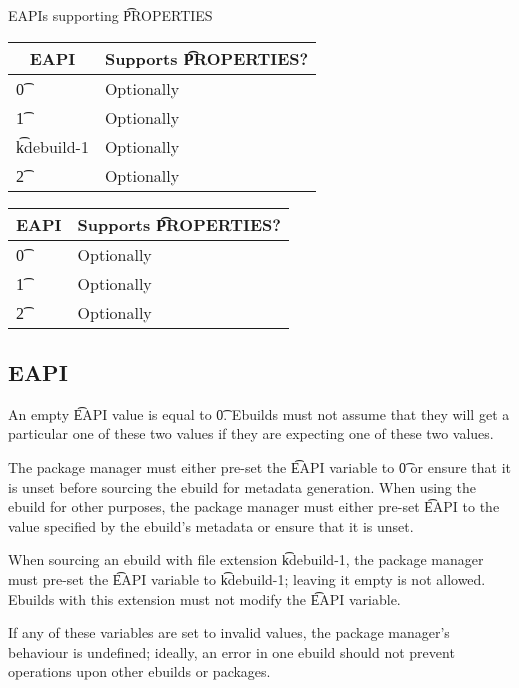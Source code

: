 \begin{centertable}{EAPIs supporting \t{PROPERTIES}} \label{tab:properties-table}
\IFKDEBUILDELSE
{
    \begin{tabular}{ l l }
        \toprule
        \multicolumn{1}{c}{\textbf{EAPI}} &
        \multicolumn{1}{c}{\textbf{Supports \t{PROPERTIES}?}} \\
        \midrule
    \t{0} & Optionally \\
    \t{1} & Optionally \\
    \t{kdebuild-1} & Optionally \\
    \t{2} & Optionally \\
    \bottomrule
    \end{tabular}
}
{
    \begin{tabular}{ l l }
        \toprule
        \multicolumn{1}{c}{\textbf{EAPI}} &
        \multicolumn{1}{c}{\textbf{Supports \t{PROPERTIES}?}} \\
        \midrule
    \t{0} & Optionally \\
    \t{1} & Optionally \\
    \t{2} & Optionally \\
    \bottomrule
    \end{tabular}
}
\end{centertable}

\subsection{EAPI}
\label{sec:pre-source-eapi}

An empty \t{EAPI} value is equal to \t{0}. Ebuilds must not assume that they will get a particular
one of these two values if they are expecting one of these two values.

The package manager must either pre-set the \t{EAPI} variable to \t{0} or ensure that it is unset
before sourcing the ebuild for metadata generation. When using the ebuild for other purposes, the
package manager must either pre-set \t{EAPI} to the value specified by the ebuild's metadata or
ensure that it is unset.

\IFKDEBUILDELSE
{
    When sourcing an ebuild with file extension \t{kdebuild-1}, the package manager must pre-set the
    \t{EAPI} variable to \t{kdebuild-1}; leaving it empty is not allowed. Ebuilds with this
    extension must not modify the \t{EAPI} variable.
}{
}

If any of these variables are set to invalid values, the package manager's behaviour is undefined;
ideally, an error in one ebuild should not prevent operations upon other ebuilds or packages.

